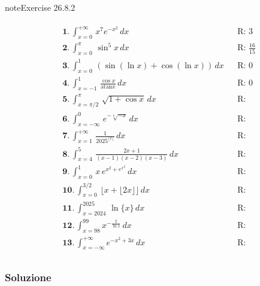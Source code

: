 \documentclass[letterpaper,10pt,italian]{jupyterBook}
\begin{document}
\begin{sphinxadmonition}{note}{Exercise 26.8.2}
\begin{itemize}
\end{itemize}
\begin{equation*}
\begin{split}\begin{aligned}
 & \mathbf{1.} \,  \int_{x=0}^{+\infty} \, x^7 e^{-x^2} \, dx && \text{R: } 3 \\ 
 & \mathbf{2.} \,  \int_{x=0}^{\pi} \, \sin^5 x \, dx && \text{R: } \frac{16}{15} \\
 & \mathbf{3.} \,  \int_{x=0}^{1} \, \left( \sin (\ln x) + \cos(\ln x) \right) \, dx && \text{R: } 0 \\
 & \mathbf{4.} \,  \int_{x=-1}^{1} \, \frac{\cos x}{\text{atan} x} \, dx && \text{R: } 0 \\
 & \mathbf{5.} \,  \int_{x=\pi/2}^{\pi} \, \sqrt{1 + \cos x} \, dx && \text{R: }  \\
 & \mathbf{6.} \,  \int_{x=-\infty}^{0} \, e^{-\sqrt[6]{-x}} \, dx && \text{R: }  \\
 & \mathbf{7.} \,  \int_{x=1}^{+\infty} \, \frac{1}{2025^{\lfloor x \rfloor}} \, dx && \text{R: }  \\
 & \mathbf{8.} \,  \int_{x=4}^{5} \, \frac{2x+1}{(x-1)(x-2)(x-3)} \, dx && \text{R: }  \\ 
 & \mathbf{9.} \,  \int_{x=0}^{1} \, x \, e^{x^2 + e^{x^2}} \, dx && \text{R: }  \\
 & \mathbf{10.}\,  \int_{x=0}^{3/2} \, \lfloor x + \lfloor 2x \rfloor \rfloor \, dx && \text{R: }  \\
 & \mathbf{11.}\,  \int_{x=2024}^{2025} \, \ln \{ x \} \, dx && \text{R: }  \\
 & \mathbf{12.}\,  \int_{x=98}^{99} x^{-\frac{2}{\ln x}} \, dx && \text{R: }  \\
 & \mathbf{13.}\,  \int_{x=-\infty}^{+\infty} e^{-x^2 + 3x} \, dx && \text{R: }  \\
\end{aligned}\end{split}
\end{equation*}\end{sphinxadmonition}
\subsubsection*{Soluzione}
\end{document}
